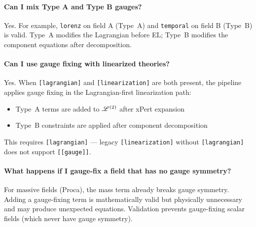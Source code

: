 \paragraph{Can I mix Type A and Type B gauges?}
Yes. For example, \texttt{lorenz} on field A (Type~A) and \texttt{temporal} on field B
(Type~B) is valid. Type~A modifies the Lagrangian before EL; Type~B
modifies the component equations after decomposition.

\paragraph{Can I use gauge fixing with linearized theories?}
Yes. When \texttt{[lagrangian]} and \texttt{[linearization]} are both present, the pipeline
applies gauge fixing in the Lagrangian-first linearization path:

\begin{itemize}
  \item Type~A terms are added to $\mathscr{L}^{(2)}$ after xPert expansion
  \item Type~B constraints are applied after component decomposition
\end{itemize}

This requires \texttt{[lagrangian]} --- legacy \texttt{[linearization]} without \texttt{[lagrangian]}
does not support \texttt{[[gauge]]}.

\paragraph{What happens if I gauge-fix a field that has no gauge symmetry?}
For massive fields (Proca), the mass term already breaks gauge symmetry.
Adding a gauge-fixing term is mathematically valid but physically
unnecessary and may produce unexpected equations. Validation prevents
gauge-fixing scalar fields (which never have gauge symmetry).
